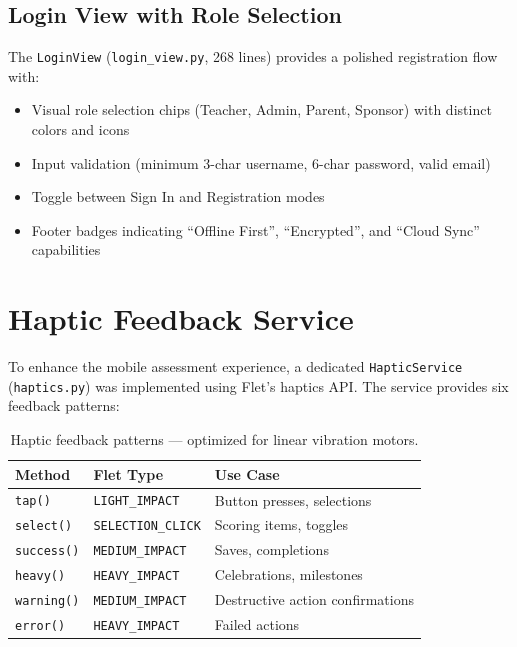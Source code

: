 \documentclass[12pt,a4paper]{article}
\begin{document}
\subsection{Login View with Role Selection}

The \texttt{LoginView} (\texttt{login\_view.py}, 268 lines) provides a polished registration flow with:

\begin{itemize}[leftmargin=2em]
    \item Visual role selection chips (Teacher, Admin, Parent, Sponsor) with distinct colors and icons
    \item Input validation (minimum 3-char username, 6-char password, valid email)
    \item Toggle between Sign In and Registration modes
    \item Footer badges indicating ``Offline First'', ``Encrypted'', and ``Cloud Sync'' capabilities
\end{itemize}

\section{Haptic Feedback Service}

To enhance the mobile assessment experience, a dedicated \texttt{HapticService} (\texttt{haptics.py}) was implemented using Flet's haptics API. The service provides six feedback patterns:

\begin{table}[H]
\centering
\begin{tabular}{@{}lll@{}}
\toprule
\textbf{Method}    & \textbf{Flet Type}           & \textbf{Use Case} \\
\midrule
\texttt{tap()}     & \texttt{LIGHT\_IMPACT}       & Button presses, selections \\
\texttt{select()}  & \texttt{SELECTION\_CLICK}     & Scoring items, toggles \\
\texttt{success()} & \texttt{MEDIUM\_IMPACT}       & Saves, completions \\
\texttt{heavy()}   & \texttt{HEAVY\_IMPACT}        & Celebrations, milestones \\
\texttt{warning()} & \texttt{MEDIUM\_IMPACT}       & Destructive action confirmations \\
\texttt{error()}   & \texttt{HEAVY\_IMPACT}        & Failed actions \\
\bottomrule
\end{tabular}
\caption{Haptic feedback patterns — optimized for linear vibration motors.}
\end{table}
\end{document}
